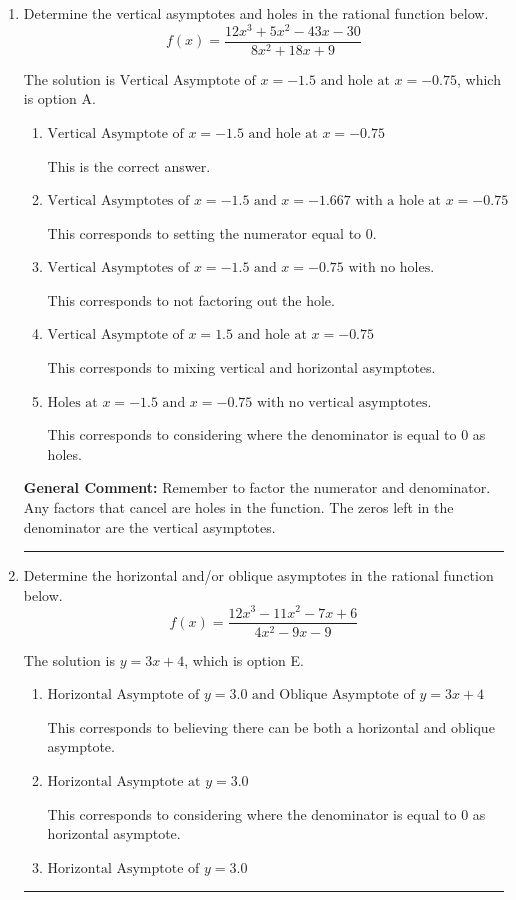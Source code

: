 \documentclass{extbook}[14pt]
\newcommand{\litem}[1]{\item #1

\rule{\textwidth}{0.4pt}}
\begin{document}
\begin{enumerate}\litem{
Determine the vertical asymptotes and holes in the rational function below.
\[ f(x) = \frac{12x^{3} +5 x^{2} -43 x -30}{8x^{2} +18 x + 9} \]

The solution is \( \text{Vertical Asymptote of } x = -1.5 \text{ and hole at } x = -0.75 \), which is option A.\begin{enumerate}[label=\Alph*.]
\item \( \text{Vertical Asymptote of } x = -1.5 \text{ and hole at } x = -0.75 \)

This is the correct answer.
\item \( \text{Vertical Asymptotes of } x = -1.5 \text{ and } x = -1.667 \text{ with a hole at } x = -0.75 \)

This corresponds to setting the numerator equal to 0.
\item \( \text{Vertical Asymptotes of } x = -1.5 \text{ and } x = -0.75 \text{ with no holes.} \)

This corresponds to not factoring out the hole.
\item \( \text{Vertical Asymptote of } x = 1.5 \text{ and hole at } x = -0.75 \)

This corresponds to mixing vertical and horizontal asymptotes.
\item \( \text{Holes at } x = -1.5 \text{ and } x = -0.75 \text{ with no vertical asymptotes.} \)

This corresponds to considering where the denominator is equal to 0 as holes.
\end{enumerate}

\textbf{General Comment:} Remember to factor the numerator and denominator. Any factors that cancel are holes in the function. The zeros left in the denominator are the vertical asymptotes.
}
\litem{
Determine the horizontal and/or oblique asymptotes in the rational function below.
\[ f(x) = \frac{12x^{3} -11 x^{2} -7 x + 6}{4x^{2} -9 x -9} \]

The solution is \( y = 3x + 4 \), which is option E.\begin{enumerate}[label=\Alph*.]
\item \( \text{Horizontal Asymptote of } y = 3.0 \text{ and Oblique Asymptote of } y = 3x + 4 \)

This corresponds to believing there can be both a horizontal and oblique asymptote.
\item \( \text{Horizontal Asymptote at } y = 3.0 \)

This corresponds to considering where the denominator is equal to 0 as horizontal asymptote.
\item \( \text{Horizontal Asymptote of } y = 3.0  \)


\end{enumerate}}
\end{enumerate}
\end{document}
